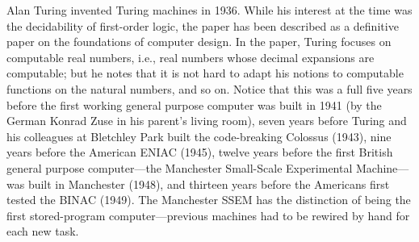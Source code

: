 \documentclass[../../../include/open-logic-section]{subfiles}
\begin{document}
\begin{history}
Alan Turing invented Turing machines in 1936. While his interest at
the time was the decidability of first-order logic, the paper has been
described as a definitive paper on the foundations of computer
design. In the paper, Turing focuses on computable real numbers, i.e.,
real numbers whose decimal expansions are computable; but he notes
that it is not hard to adapt his notions to computable functions on
the natural numbers, and so on.  Notice that this was a full five
years before the first working general purpose computer was built in
1941 (by the German Konrad Zuse in his parent's living room), seven
years before Turing and his colleagues at Bletchley Park built the
code-breaking Colossus (1943), nine years before the American ENIAC
(1945), twelve years before the first British general purpose
computer---the Manchester Small-Scale Experimental Machine---was built in
Manchester (1948), and thirteen years before the Americans first
tested the BINAC (1949). The Manchester SSEM has the distinction of
being the first stored-program computer---previous machines had to be
rewired by hand for each new task.
\end{history}
\end{document}
